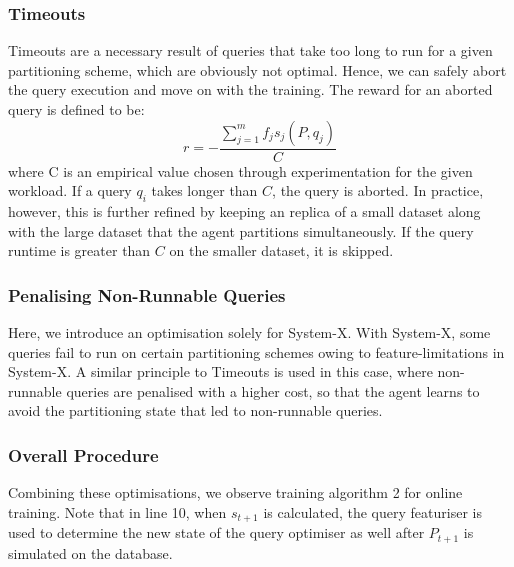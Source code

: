 \subsubsection{Timeouts}
Timeouts are a necessary result of queries that take too long to run for a given partitioning scheme, which are obviously not optimal. Hence, we can safely abort the query execution and move on with the training. The reward for an aborted query is defined to be:
\begin{equation}
    r = - \frac{\sum^m_{j=1}f_js_j(P,q_j)}{C}
\end{equation}
where C is an empirical value chosen through experimentation for the given workload. If a query $q_i$ takes longer than $C$, the query is aborted. In practice, however, this is further refined by keeping an replica of a small dataset along with the large dataset that the agent partitions simultaneously. If the query runtime is greater than $C$ on the smaller dataset, it is skipped.

\subsubsection{Penalising Non-Runnable Queries}
\label{sec:penalise-query}
Here, we introduce an optimisation solely for System-X. With System-X, some queries fail to run on certain partitioning schemes owing to feature-limitations in System-X. A similar principle to Timeouts is used in this case, where non-runnable queries are penalised with a higher cost, so that the agent learns to avoid the partitioning state that led to non-runnable queries.

\subsubsection{Overall Procedure}
Combining these optimisations, we observe training algorithm 2 for online training. Note that in line 10, when $s_{t+1}$ is calculated, the query featuriser is used to determine the new state of the query optimiser as well after $P_{t+1}$ is simulated on the database.

